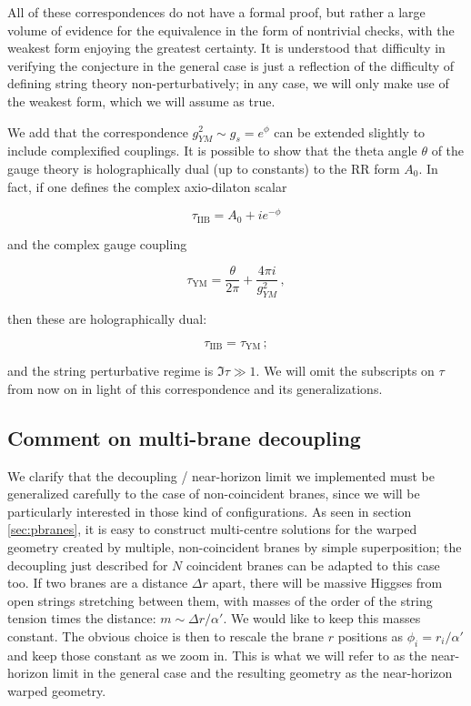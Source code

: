 All of these correspondences do not have a formal proof, but rather a large volume of evidence for the equivalence in the form of nontrivial checks, with the weakest form enjoying the greatest certainty. It is understood that difficulty in verifying the conjecture in the general case is just a reflection of the difficulty of defining string theory non-perturbatively; in any case, we will only make use of the weakest form, which we will assume as true.

We add that the correspondence $g_{YM}^2 \sim g_s = e^\phi$ can be extended slightly to include complexified couplings. It is possible to show that the theta angle $\theta$ of the gauge theory is holographically dual (up to constants) to the RR form $A_0$. In fact, if one defines the complex axio-dilaton scalar

\begin{equation}
	\tau_\mathrm{IIB} = A_0 + ie^{-\phi}
	\label{}
\end{equation}

and the complex gauge coupling

\begin{equation}
	\tau_\mathrm{YM} = \frac{\theta}{2\pi} + \frac{4\pi i}{g_{YM}^2}\,,
	\label{}
\end{equation}

then these are holographically dual:

\begin{equation}
	\tau_\mathrm{IIB} = \tau_\mathrm{YM}\,;
	\label{}
\end{equation}

and the string perturbative regime is $\Im \tau \gg 1$. We will omit the subscripts on $\tau$ from now on in light of this correspondence and its generalizations.

\subsection{Comment on multi-brane decoupling}

We clarify that the decoupling / near-horizon limit we implemented must be generalized carefully to the case of non-coincident branes, since we will be particularly interested in those kind of configurations. As seen in section \ref{sec:pbranes}, it is easy to construct multi-centre solutions for the warped geometry created by multiple, non-coincident branes by simple superposition; the decoupling just described for $N$ coincident branes can be adapted to this case too. If two branes are a distance $\Delta r$ apart, there will be massive Higgses from open strings stretching between them, with masses of the order of the string tension times the distance: $m \sim \Delta r / \alpha'$. We would like to keep this masses constant. The obvious choice is then to rescale the brane $r$ positions as $\phi_i = r_i / \alpha'$ and keep those constant as we zoom in. This is what we will refer to as the near-horizon limit in the general case and the resulting geometry as the near-horizon warped geometry.\\

